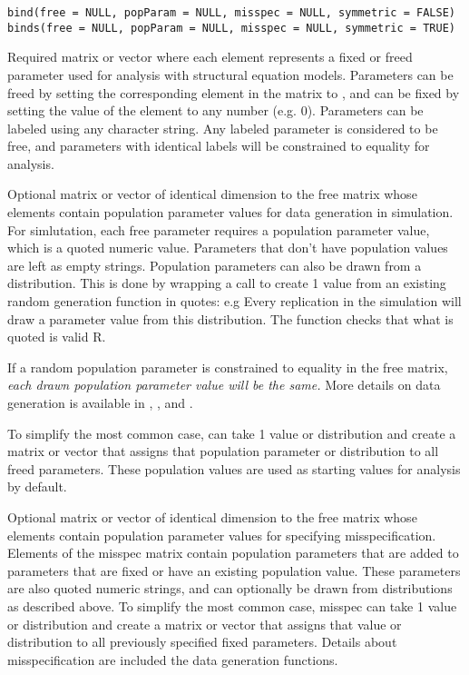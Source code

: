 \documentclass[a4paper]{book}
\begin{document}
%
\begin{Usage}
\begin{verbatim}
bind(free = NULL, popParam = NULL, misspec = NULL, symmetric = FALSE)
binds(free = NULL, popParam = NULL, misspec = NULL, symmetric = TRUE)
\end{verbatim}
\end{Usage}
%
\begin{Arguments}
\begin{ldescription}
\item[\code{free}] Required matrix or vector where each element represents a fixed or freed parameter used for analysis with structural equation models. Parameters can be freed by setting the corresponding element in the matrix to , and can be fixed by setting the value of the element to any number (e.g. 0). Parameters can be labeled using any character string. Any labeled parameter is considered to be free, and parameters with identical labels will be constrained to equality for analysis.

\item[\code{popParam}] Optional matrix or vector of identical dimension to the free matrix whose elements contain population parameter values for data generation in simulation. For simlutation, each free parameter requires a population parameter value, which is a quoted numeric value. Parameters that don't have population values are left as empty strings.
Population parameters can also be drawn from a distribution. This is done by wrapping a call to create 1 value from an existing random generation function in quotes: e.g  Every replication in the simulation will draw a parameter value from this distribution. The function checks that what is quoted is valid R.

If a random population parameter is constrained to equality in the free matrix, \emph{each drawn population parameter value will be the same.} More details on data generation is available in , , and .

To simplify the most common case,  can take 1 value or distribution and create a matrix or vector that assigns that population parameter or distribution to all freed parameters. These population values are used as starting values for analysis by default.

\item[\code{misspec}] Optional matrix or vector of identical dimension to the free matrix whose elements contain population parameter values for specifying misspecification. Elements of the misspec matrix contain population parameters that are added to parameters that are fixed or have an existing population value. These parameters are also quoted numeric strings, and can optionally be drawn from distributions as described above. To simplify the most common case, misspec can take 1 value or distribution and create a matrix or vector that assigns that value or distribution to all previously specified fixed parameters. Details about misspecification are included the data generation functions.


\end{ldescription}
\end{Arguments}
\end{document}
